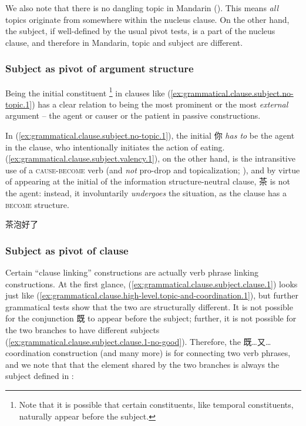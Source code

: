 \documentclass[UTF8, a4paper, oneside, scheme=plain, 12pt]{ctexrep}
\newcommand*{\category}[1]{\textsc{#1}}
\begin{document}
We also note that there is no dangling topic in Mandarin ().
This means \emph{all} topics originate from somewhere within the nucleus clause.
On the other hand, the subject, if well-defined by the usual pivot tests, is a part of the nucleus clause,
and therefore in Mandarin, topic and subject are different.

\subsubsection{Subject as pivot of argument structure}\label{sec:grammatical.clause.subject.argument}

Being the initial constituent%
\footnote{
    Note that it is possible that certain constituents, like temporal constituents,
    naturally appear before the subject.
}
in clauses like (\ref{ex:grammatical.clause.subject.no-topic.1}) 
has a clear relation to being the most prominent or the most \emph{external} argument
-- the agent or causer or the patient in passive constructions.

In (\ref{ex:grammatical.clause.subject.no-topic.1}),
the initial 你 \emph{has to} be the agent in the clause,
who intentionally initiates the action of eating.
(\ref{ex:grammatical.clause.subject.valency.1}),
on the other hand, is the intransitive use of a \category{cause}-\category{become} verb
(and \emph{not} pro-drop and topicalization; ),
and by virtue of appearing at the initial of
the information structure-neutral clause,
茶 is not the agent: instead, it involuntarily \emph{undergoes} the situation,
as the clause has a \category{become} structure.

\begin{exe}
    \ex\label{ex:grammatical.clause.subject.valency.1} 茶泡好了
\end{exe}

\subsubsection{Subject as pivot of clause}\label{sec:grammatical.clause.subject.clause}

Certain ``clause linking'' constructions are actually verb phrase linking constructions.
At the first glance, (\ref{ex:grammatical.clause.subject.clause.1}) looks just like (\ref{ex:grammatical.clause.high-level.topic-and-coordination.1}),
but further grammatical tests show that the two are structurally different.
It is not possible for the conjunction 既 to appear before the subject;
further, it is not possible for the two branches to have different subjects
(\ref{ex:grammatical.clause.subject.clause.1-no-good}).
Therefore, the 既…又… coordination construction (and many more) is for connecting two verb phrases,
and we note that that the element shared by the two branches is
always the subject defined in :
\end{document}
